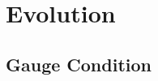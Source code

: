 \documentclass[%
 reprint,
 amsmath,amssymb,
 aps,
 prd,
]{revtex4-2}
\begin{document}
%
%
%
%

\section{Evolution}

\subsection{Gauge Condition}
\end{document}
